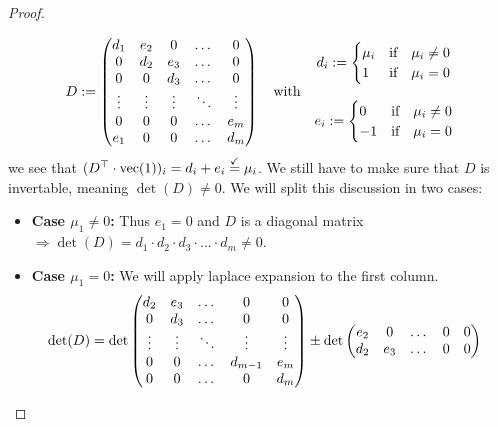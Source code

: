 \begin{proof}
\begin{enumerate}
        $$D := \left(\begin{matrix}
            d_1 & e_2 & 0 & \dots & 0\\
            0 & d_2 & e_3 & \dots & 0\\
            0 & 0 & d_3 & \dots & 0\\
            \vdots & \vdots & \vdots & \ddots & \vdots\\
            0 & 0 & 0 & \dots & e_m\\
            e_1 & 0 & 0 & \dots & d_m
        \end{matrix}\right) \quad\textrm{with}\quad 
        \begin{matrix}
            d_i := \begin{cases}
                \mu_i &\textrm{if}\quad \mu_i \neq 0\\
                1 &\textrm{if}\quad \mu_i = 0
            \end{cases}\\\\
            e_i := \begin{cases}
                0 &\textrm{if}\quad \mu_i \neq 0\\
                -1 &\textrm{if}\quad \mu_i = 0
            \end{cases}
        \end{matrix}$$
        we see that $(D^\top \cdot \operatorname{vec}(1))_i = d_i + e_i \stackrel{\checkmark}{=} \mu_i$. We still have to make sure that $D$ is invertable, meaning $\det(D) \neq 0$. We will split this discussion in two cases:
        \begin{itemize}
            \item \textbf{Case $\mu_1 \neq 0$:} Thus $e_1 = 0$ and $D$ is a diagonal matrix $\Rightarrow \det(D) = d_1 \cdot d_2 \cdot d_3 \cdot ... \cdot d_m \neq 0$.
            \item \textbf{Case $\mu_1 = 0$:} We will apply laplace expansion to the first column.
            \begin{align*}  
                \det(D) &= \det\left(\begin{matrix}
                    d_2 & e_3 & \dots & 0 & 0\\
                    0 & d_3 & \dots & 0 & 0\\
                    \vdots & \vdots & \ddots & \vdots& \vdots\\
                    0 & 0 & \dots & d_{m-1} & e_m\\
                    0 & 0 & \dots & 0 & d_m
                \end{matrix}\right) \pm \det\left(\begin{matrix}
                    e_2 & 0 & \dots & 0 & 0\\
                    d_2 & e_3 & \dots & 0 & 0\\
\end{matrix}\right)
\end{align*}
\end{itemize}
\end{enumerate}
\end{proof}
